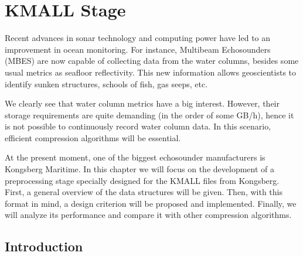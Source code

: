 \chapter{KMALL Stage}
\begin{comment}
Aquesta etapa decorreladora està enfocada a dades provinents de sondes submarines de l'empresa KONGSBERG.

La informació més interessant dels fitxers .kmall (ordre dels 100 MB) és la de les columnes d'aigua (ocupa el 99\% de la mida total del fitxer). El format d'aquests fitxers està basat en datagrames, la documentació dels quals és pública a la web de KONGSBERG (com que és un dOxygen potser ho pugem al servidor de DAPCOM, ho he de parlar amb en Jordi).

Com que FAPEC comprimeix per chunks s'ha de parar especial atenció a no partir un datagrama per la meitat o F al xat.
\end{comment}

Recent advances in sonar technology and computing power have led to an improvement in ocean monitoring. For instance, Multibeam Echosounders (MBES) are now capable of collecting data from the water columns, besides some usual metrics as seafloor reflectivity. This new information allows geoscientists to identify sunken structures, schools of fish, gas seeps, etc.

We clearly see that water column metrics have a big interest. However, their storage requirements are quite demanding (in the order of some GB/h), hence it is not possible to continuously record water column data. In this scenario, efficient compression algorithms will be essential.

At the present moment, one of the biggest echosounder manufacturers is Kongsberg Maritime. In this chapter we will focus on the development of a preprocessing stage specially designed for the KMALL files from Kongsberg. First, a general overview of the data structures will be given. Then, with this format in mind, a design criterion will be proposed and implemented. Finally, we will analyze its performance and compare it with other compression algorithms.

\section{Introduction}
\begin{comment}
Explicar les estructures de dades del KMALL i KMWCD basant-me en el dOxygen de Kongsberg. Cal incloure informació física de la sonda? Què és un datagrama?
\end{comment}


